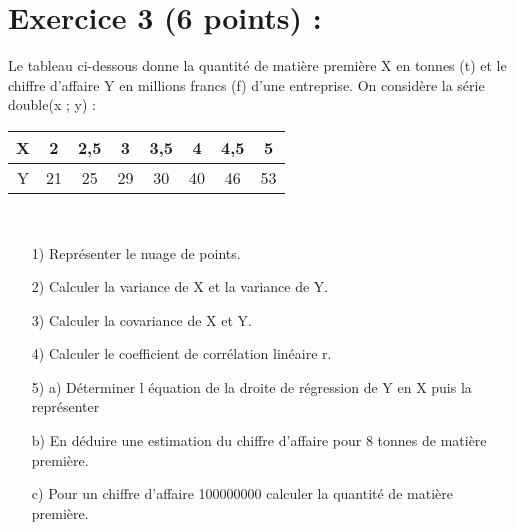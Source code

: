 \documentclass{article}
\begin{document}
\section*{Exercice 3 (6 points) :}
Le tableau ci-dessous  donne la quantité de matière première X en tonnes (t) et le chiffre d’affaire Y en millions francs (f) d’une entreprise. On considère  la série double(x ; y) :

\begin{tabular}{|c|c|c|c|c|c|c|c|}
\hline
X & 2 & 2,5 & 3 & 3,5 & 4 & 4,5 & 5 \\
\hline
Y & 21 & 25 & 29 & 30 & 40 & 46 & 53\\
\hline
\end{tabular}\\
\begin{itemize}
\item[1)] Représenter le nuage de points.\\
\item[2)] Calculer la variance de X et la variance de Y.\\
\item[3)]  Calculer la covariance de X et Y.\\
\item[4)] Calculer le coefficient de corrélation linéaire r.\\
\item[5)] a)  Déterminer l équation de la droite de régression de Y en X puis la représenter\\
\item[b)]  En déduire une estimation du chiffre d’affaire pour 8 tonnes de matière première.\\
\item[c)]  Pour un chiffre d’affaire 100000000 calculer la quantité de matière première.

\end{itemize}
\end{document}

